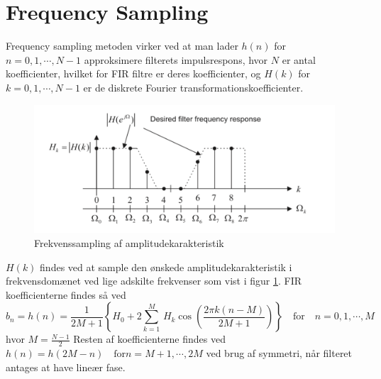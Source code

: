 \section{Frequency Sampling}
Frequency sampling metoden virker ved at man lader $h(n)$ for $n = 0, 1, \cdots, N - 1$ approksimere filterets impulsrespons, hvor $N$ er antal koefficienter, hvilket for FIR filtre er deres koefficienter, og $H(k)$ for $k = 0, 1, \cdots, N - 1$ er de diskrete Fourier transformationskoefficienter.
\begin{figure}[!ht]
	\includegraphics[width=\textwidth]{billeder/frequencysampling.png}
	\caption{Frekvenssampling af amplitudekarakteristik}
	\label{fig:frequencysampling}
\end{figure}
$H(k)$ findes ved at sample den ønskede amplitudekarakteristik i frekvensdomænet ved lige adskilte frekvenser som vist i figur \ref{fig:frequencysampling}.
FIR koefficienterne findes så ved
\begin{equation} \label{eq:fir_koefficienter}
b_n = h(n) = \frac{1}{2M + 1} \left\{H_0 + 2\displaystyle\sum_{k = 1}^{M}\, H_k\cos\left(\frac{2\pi k (n - M)}{2M + 1} \right) \right\} \quad \mathrm{for} \quad n = 0, 1, \cdots, M
\end{equation}
hvor $M = \frac{N - 1}{2}$
Resten af koefficienterne findes ved $h(n) = h(2M - n) \quad \mathrm{for} n = M + 1, \cdots, 2M$ ved brug af symmetri, når filteret antages at have lineær fase.


